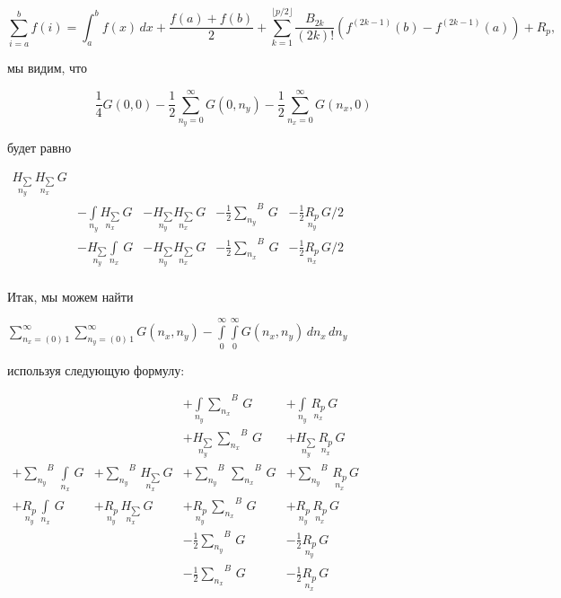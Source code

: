 \documentclass[11pt]{article}
\begin{document}
    \[{\displaystyle \sum _{i=a}^{b}f(i)=\int _{a}^{b}f(x)\,dx+{\frac {f(a)+f(b)}{2}}+\sum _{k=1}^{\lfloor p/2\rfloor }{\frac {B_{2k}}{(2k)!}}(f^{(2k-1)}(b)-f^{(2k-1)}(a))+R_{p},}\]

    мы видим, что

    \[
\frac{1}{4}G\left(0, 0\right)
- \frac{1}{2}\sum\limits_{n_y=0}^{\infty}{G\left(0, n_y\right)}
- \frac{1}{2}\sum\limits_{n_x=0}^{\infty}{G\left(n_x, 0\right)}
\]

    будет равно

    \(\begin{array}{rrllll}  \underset{n_y}{H_{\sum}}\,\underset{n_x}{H_{\sum}}\,G \\  \, &  - \int\limits_{n_y}^{} \underset{n_x}{H_{\sum}}\,G &  - \underset{n_y}{H_{\sum}} \underset{n_x}{H_{\sum}}\,G &  - \frac{1}{2}{\sum\limits_{n_y}^{}}^{B}\,G &  - \frac{1}{2}\underset{n_y}{R_{p}}\,G/2 \\  \,&  - \underset{n_y}{H_{\sum}}\int\limits_{n_x}^{} \,G &  - \underset{n_y}{H_{\sum}} \underset{n_x}{H_{\sum}}\,G &  - \frac{1}{2}{\sum\limits_{n_x}^{}}^{B}\,G &  - \frac{1}{2}\underset{n_x}{R_{p}}\,G/2 \\ \end{array}\)

    Итак, мы можем найти

\(\sum\limits_{n_x=\left(0\right)\,1}^{\infty} \sum\limits_{n_y=\left(0\right)\,1}^{\infty} G\left(n_x, n_y\right) - \int\limits_{0}^{\infty} \int\limits_{0}^{\infty} G\left(n_x, n_y\right)\,d{n_x}\,d{n_y}\)

используя следующую формулу:

    \(\begin{array}{llll}  \,&  \,&  + \int\limits_{n_y}^{}{\sum\limits_{n_x}^{}}^{B}\,G &  + \int\limits_{n_y}^{}\,\underset{n_x}{R_{p}}\,G \\  \,&  \,&  + \underset{n_y}{H_{\sum}}\,{\sum\limits_{n_x}^{}}^{B}\,G &  + \underset{n_y}{H_{\sum}}\,\underset{n_x}{R_{p}}\,G \\  + {\sum\limits_{n_y}^{}}^{B}\,\int\limits_{n_x}^{}\,G &  + {\sum\limits_{n_y}^{}}^{B}\,\underset{n_x}{H_{\sum}}\,G &  + {\sum\limits_{n_y}^{}}^{B}\,{\sum\limits_{n_x}^{}}^{B}\,G &  + {\sum\limits_{n_y}^{}}^{B}\,\underset{n_x}{R_{p}}\,G \\  + \underset{n_y}{R_{p}}\,\int\limits_{n_x}^{}\,G &  + \underset{n_y}{R_{p}}\,\underset{n_x}{H_{\sum}}\,G &  + \underset{n_y}{R_{p}}\,{\sum\limits_{n_x}^{}}^{B}\,G &  + \underset{n_y}{R_{p}}\,\underset{n_x}{R_{p}}\,G \\  \,&  \,&  - \frac{1}{2}{\sum\limits_{n_y}^{}}^{B}\,G &  - \frac{1}{2}\underset{n_y}{R_{p}}\,G \\  \,&  \,&  - \frac{1}{2}{\sum\limits_{n_x}^{}}^{B}\,G &  - \frac{1}{2}\underset{n_x}{R_{p}}\,G \\ \end{array}\)
\end{document}
